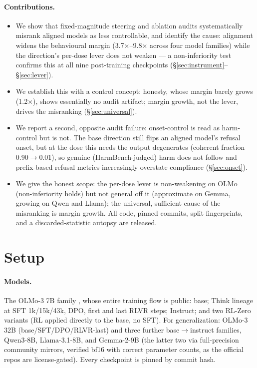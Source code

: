 \documentclass[11pt]{article}
\newcommand{\x}{$\times$}
\begin{document}
\paragraph{Contributions.}
\begin{itemize}\itemsep2pt
\item We show that fixed-magnitude steering and ablation audits systematically misrank aligned
  models as less controllable, and identify the cause: alignment widens the behavioural margin
  (\num{3.7}\x--\num{9.8}\x{} across four model families) while the direction's per-dose lever does
  not weaken --- a non-inferiority test confirms this at all nine post-training checkpoints
  (\S\ref{sec:instrument}--\S\ref{sec:lever}).
\item We establish this with a control concept: honesty, whose margin barely grows
  (\num{1.2}\x), shows essentially no audit artifact; margin growth, not the lever, drives the
  misranking (\S\ref{sec:universal}).
\item We report a second, opposite audit failure: onset-control is read as harm-control but is not.
  The base direction still flips an aligned model's refusal onset, but at the dose this needs the
  output degenerates (coherent fraction \num{0.90}$\rightarrow$\num{0.01}), so genuine
  (HarmBench-judged) harm does not follow and prefix-based refusal metrics increasingly overstate
  compliance (\S\ref{sec:onset}).
\item We give the honest scope: the per-dose lever is non-weakening on OLMo (non-inferiority holds) but not general
  off it (approximate on Gemma, growing on Qwen and Llama); the universal, sufficient cause of the
  misranking is margin growth. All code, pinned commits, split fingerprints, and a
  discarded-statistic autopsy are released.
\end{itemize}

\section{Setup}\label{sec:setup}
\paragraph{Models.} The OLMo-3 7B family \citep{olmo3}, whose entire training flow is public: base;
Think lineage at SFT 1k/15k/43k, DPO, first and last RLVR steps; Instruct; and two RL-Zero variants
(RL applied directly to the base, no SFT). For generalization: OLMo-3 32B (base/SFT/DPO/RLVR-last)
and three further base$\rightarrow$instruct families, Qwen3-8B, Llama-3.1-8B, and Gemma-2-9B (the
latter two via full-precision community mirrors, verified bf16 with correct parameter counts, as
the official repos are license-gated). Every checkpoint is pinned by commit hash.
\end{document}
